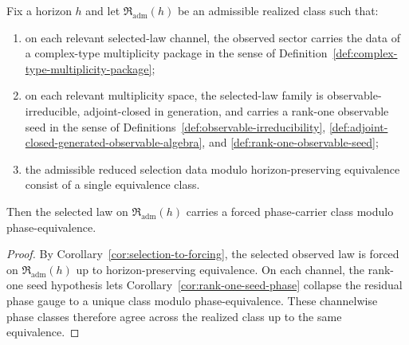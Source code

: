 \begin{corollary}
\label{cor:realized-phase-from-rank-one-seed}
Fix a horizon $h$ and let $\mathfrak R_{\mathrm{adm}}(h)$ be an admissible
realized class such that:
\begin{enumerate}[label=(\roman*), leftmargin=2em, itemsep=0.2em]
\item on each relevant selected-law channel, the observed sector carries the
      data of a complex-type multiplicity package in the sense of
      Definition~\ref{def:complex-type-multiplicity-package};
\item on each relevant multiplicity space, the selected-law family is
      observable-irreducible, adjoint-closed in generation, and carries a
      rank-one observable seed in the sense of
      Definitions~\ref{def:observable-irreducibility},
      \ref{def:adjoint-closed-generated-observable-algebra}, and
      \ref{def:rank-one-observable-seed};
\item the admissible reduced selection data modulo horizon-preserving
      equivalence consist of a single equivalence class.
\end{enumerate}
Then the selected law on $\mathfrak R_{\mathrm{adm}}(h)$ carries a forced
phase-carrier class modulo phase-equivalence.
\end{corollary}

\begin{proof}
By Corollary~\ref{cor:selection-to-forcing}, the selected observed law is
forced on $\mathfrak R_{\mathrm{adm}}(h)$ up to horizon-preserving
equivalence. On each channel, the rank-one seed hypothesis lets
Corollary~\ref{cor:rank-one-seed-phase} collapse the residual phase gauge to a
unique class modulo phase-equivalence. These channelwise phase classes
therefore agree across the realized class up to the same equivalence.
\end{proof}

